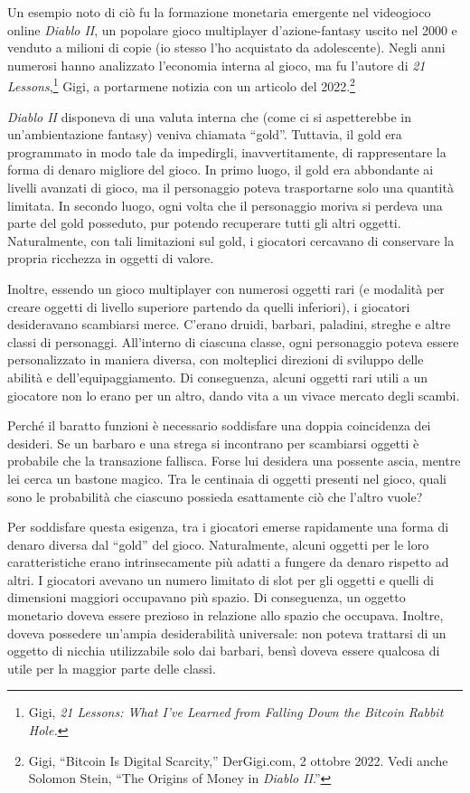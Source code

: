 \documentclass[
  a5paper,
  smalldemyvopaper,10pt,twoside,onecolumn,openright,extrafontsizes,hidelinks]{memoir}
\begin{document}
Un esempio noto di ciò fu la formazione monetaria emergente nel
videogioco online \emph{Diablo II}, un popolare gioco multiplayer
d'azione-fantasy uscito nel 2000 e venduto a milioni di copie (io stesso
l'ho acquistato da adolescente). Negli anni numerosi hanno analizzato
l'economia interna al gioco, ma fu l'autore di \emph{21
Lessons},\footnote{Gigi, \emph{21 Lessons: What I've Learned from
  Falling Down the Bitcoin Rabbit Hole.}} Gigi, a portarmene notizia con
un articolo del 2022.\footnote{Gigi, ``Bitcoin Is Digital Scarcity,''
  DerGigi.com, 2 ottobre 2022. Vedi anche Solomon Stein, ``The Origins
  of Money in \emph{Diablo II}.''}

\emph{Diablo II} disponeva di una valuta interna che (come ci si
aspetterebbe in un'ambientazione fantasy) veniva chiamata ``gold''.
Tuttavia, il gold era programmato in modo tale da impedirgli,
inavvertitamente, di rappresentare la forma di denaro migliore del
gioco. In primo luogo, il gold era abbondante ai livelli avanzati di
gioco, ma il personaggio poteva trasportarne solo una quantità limitata.
In secondo luogo, ogni volta che il personaggio moriva si perdeva una
parte del gold posseduto, pur potendo recuperare tutti gli altri
oggetti. Naturalmente, con tali limitazioni sul gold, i giocatori
cercavano di conservare la propria ricchezza in oggetti di valore.

Inoltre, essendo un gioco multiplayer con numerosi oggetti rari (e
modalità per creare oggetti di livello superiore partendo da quelli
inferiori), i giocatori desideravano scambiarsi merce. C'erano druidi,
barbari, paladini, streghe e altre classi di personaggi. All'interno di
ciascuna classe, ogni personaggio poteva essere personalizzato in
maniera diversa, con molteplici direzioni di sviluppo delle abilità e
dell'equipaggiamento. Di conseguenza, alcuni oggetti rari utili a un
giocatore non lo erano per un altro, dando vita a un vivace mercato
degli scambi.

Perché il baratto funzioni è necessario soddisfare una doppia
coincidenza dei desideri. Se un barbaro e una strega si incontrano per
scambiarsi oggetti è probabile che la transazione fallisca. Forse lui
desidera una possente ascia, mentre lei cerca un bastone magico. Tra le
centinaia di oggetti presenti nel gioco, quali sono le probabilità che
ciascuno possieda esattamente ciò che l'altro vuole?

Per soddisfare questa esigenza, tra i giocatori emerse rapidamente una
forma di denaro diversa dal ``gold'' del gioco. Naturalmente, alcuni
oggetti per le loro caratteristiche erano intrinsecamente più adatti a
fungere da denaro rispetto ad altri. I giocatori avevano un numero
limitato di slot per gli oggetti e quelli di dimensioni maggiori
occupavano più spazio. Di conseguenza, un oggetto monetario doveva
essere prezioso in relazione allo spazio che occupava. Inoltre, doveva
possedere un'ampia desiderabilità universale: non poteva trattarsi di un
oggetto di nicchia utilizzabile solo dai barbari, bensì doveva essere
qualcosa di utile per la maggior parte delle classi.
\end{document}
